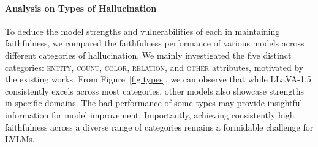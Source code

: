 \paragraph{Analysis on Types of Hallucination}
To deduce the model strengths and vulnerabilities of each in maintaining faithfulness, we compared the faithfulness performance of various models across different categories of hallucination.
We mainly investigated the five distinct categories: \textsc{entity}, \textsc{count}, \textsc{color}, \textsc{relation}, and \textsc{other} attributes, motivated by the existing works. 
From Figure~\ref{fig:types}, we can observe that while LLaVA-1.5 consistently excels across most categories, other models also showcase strengths in specific domains. 
The bad performance of some types may provide insightful information for model improvement. 
Importantly, achieving consistently high faithfulness across a diverse range of categories remains a formidable challenge for LVLMs. 






